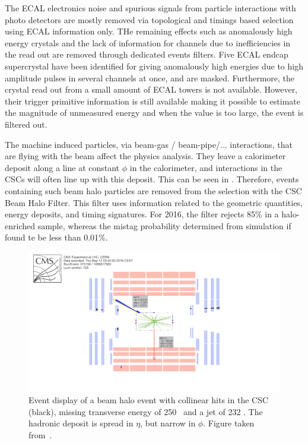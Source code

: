 The ECAL electronics noise and spurious signals from particle interactions with photo detectors are mostly removed via topological and timings based selection using  ECAL information only. THe remaining effects such as anomalously high energy crystals and the lack of information for channels due to inefficiencies in the read out are removed through dedicated events filters. Five ECAL endcap supercrystal have been identified for giving anomalously high energies due to high amplitude pulses in several channels at once, and are masked. Furthermore, the crystal read out from a small amount of ECAL towers is not available. However, their trigger primitive information is still available making it possible to estimate the magnitude of unmeasured energy and when the value is too large, the event is filtered out. 

The machine induced particles, via beam-gas / beam-pipe/... interactions, that are flying with the beam affect the physics analysis. They leave a calorimeter deposit along a line at constant $\phi$ in the calorimeter, and interactions in the CSCs will often line up with this deposit. This can be seen in . Therefore, events containing such beam halo particles are removed from the selection with the CSC Beam Halo Filter. This filter uses information related to the geometric quantities, energy deposits, and timing signatures. For 2016, the filter rejects 85\% in a halo-enriched sample, whereas the mistag probability determined from simulation if found te  be less than 0.01\%.  
\begin{figure}[htbp]
	\centering
	\includegraphics[width=1.\linewidth]{5_EventSelection/Figures/Figure_004}
	\caption{Event display of a beam halo event with collinear hits in the CSC (black), missing transverse energy of 250 \GeV\, and a jet of 232 \GeV. The hadronic deposit is spread in $\eta$, but narrow in $\phi$. Figure taken from~\cite{CMS-PAS-JME-16-004}. }
	\label{fig:beamhalo}
\end{figure}

